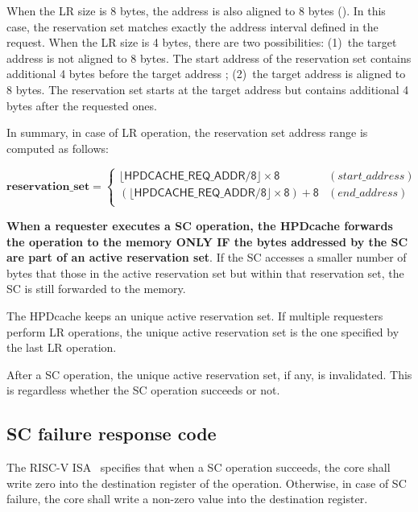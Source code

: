 \documentclass[10pt,titlepage,twoside]{book}
\begin{document}
When the \ac{LR} size is 8 bytes, the address is also aligned to 8 bytes ().
In this case, the reservation set matches exactly the address interval defined in the request.
When the \ac{LR} size is 4 bytes, there are two possibilities: (1)~the target address is not aligned to 8 bytes.
The start address of the reservation set contains additional 4 bytes before the target address ;
(2)~the target address is aligned to 8 bytes.
The reservation set starts at the target address but contains additional 4 bytes after the requested ones.

In summary, in case of \ac{LR} operation, the reservation set address range is computed as follows:

\begin{equation*}
    \mathbf{reservation\_set =}
    \begin{cases}
    \mathsf{\lfloor{}HPDCACHE\_REQ\_ADDR / 8\rfloor{} \times 8} &
      (start\_address) \\
    \mathsf{(\lfloor{}HPDCACHE\_REQ\_ADDR / 8\rfloor{} \times 8) + 8} &
      (end\_address) \\
    \end{cases}
\end{equation*}

{\bf When a requester executes a \ac{SC} operation, the \ac{HPDcache} forwards the operation to the memory ONLY IF the bytes addressed by the \ac{SC} are part of an active reservation set}.
If the \ac{SC} accesses a smaller number of bytes that those in the active reservation set but within that reservation set, the \ac{SC} is still forwarded to the memory.

The \ac{HPDcache} keeps an unique active reservation set.
If multiple requesters perform \ac{LR} operations, the unique active reservation set is the one specified by the last \ac{LR} operation.


After a \ac{SC} operation, the unique active reservation set, if any, is invalidated.
This is regardless whether the \ac{SC} operation succeeds or not.


\subsection{\ac*{SC} failure response code}

The RISC-V ISA~\cite{RISCV_spec} specifies that when a \ac{SC} operation succeeds, the core shall write zero into the destination register of the operation.
Otherwise, in case of \ac{SC} failure, the core shall write a non-zero value into the destination register.
\end{document}
